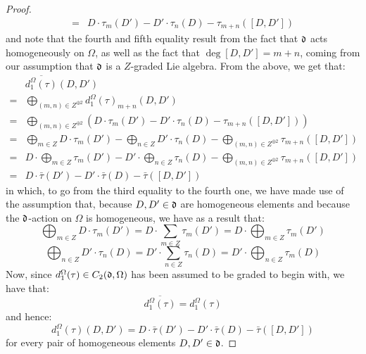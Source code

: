 \begin{proof}
$$\begin{aligned}
                            = & D \cdot \tau_m(D') - D' \cdot \tau_n(D) - \tau_{m + n}([D, D'])
                        \end{aligned}
                    $$
                and note that the fourth and fifth equality result from the fact that $\mathfrak{d}$ acts homogeneously on $\Omega$, as well as the fact that $\deg [D, D'] = m + n$, coming from our assumption that $\mathfrak{d}$ is a $Z$-graded Lie algebra. From the above, we get that:
                    $$
                        \begin{aligned}
                            & \overline{d_1^{\Omega}(\tau)}(D, D')
                            \\
                            = & \bigoplus_{(m, n) \in Z^{\oplus 2} } d_1^{\Omega}(\tau)_{m + n}(D, D')
                            \\
                            = & \bigoplus_{(m, n) \in Z^{\oplus 2} } \left( D \cdot \tau_m(D') - D' \cdot \tau_n(D) - \tau_{m + n}([D, D']) \right)
                            \\
                            = & \bigoplus_{m \in Z} D \cdot \tau_m(D') - \bigoplus_{n \in Z} D' \cdot \tau_n(D) - \bigoplus_{(m, n) \in Z^{\oplus 2} } \tau_{m + n}([D, D'])
                            \\
                            = & D \cdot \bigoplus_{m \in Z} \tau_m(D') - D' \cdot \bigoplus_{n \in Z} \tau_n(D) - \bigoplus_{(m, n) \in Z^{\oplus 2} } \tau_{m + n}([D, D'])
                            \\
                            = & D \cdot \bar{\tau}(D') - D' \cdot \bar{\tau}(D) - \bar{\tau}([D, D'])
                        \end{aligned}
                    $$
                in which, to go from the third equality to the fourth one, we have made use of the assumption that, because $D, D' \in \mathfrak{d}$ are homogeneous elements and because the $\mathfrak{d}$-action on $\Omega$ is homogeneous, we have as a result that:
                    $$\bigoplus_{m \in Z} D \cdot \tau_m(D') = D \cdot \sum_{m \in Z} \tau_m(D') = D \cdot \bigoplus_{m \in Z} \tau_m(D')$$
                    $$\bigoplus_{n \in Z} D' \cdot \tau_n(D) = D' \cdot \sum_{n \in Z} \tau_n(D) = D' \cdot \bigoplus_{n \in Z} \tau_m(D)$$
                Now, since $d_1^{\Omega}(\tau) \in C_2(\mathfrak{d}, \Omega)$ has been assumed to be graded to begin with, we have that:
                    $$\overline{d_1^{\Omega}(\tau)} = d_1^{\Omega}(\tau)$$
                and hence:
                    $$d_1^{\Omega}(\tau)(D, D') = D \cdot \bar{\tau}(D') - D' \cdot \bar{\tau}(D) - \bar{\tau}([D, D'])$$
                for every pair of homogeneous elements $D, D' \in \mathfrak{d}$. 
            \end{proof}

